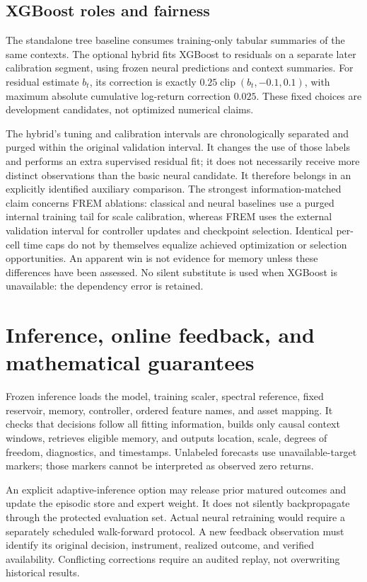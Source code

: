 \documentclass[11pt,a4paper]{article}
\newcommand{\clip}{\operatorname{clip}}
\begin{document}
\subsection{XGBoost roles and fairness}

The standalone tree baseline consumes training-only tabular summaries of the same contexts. The optional hybrid fits XGBoost to residuals on a separate later calibration segment, using frozen neural predictions and context summaries. For residual estimate $b_t$, its correction is exactly $0.25\clip(b_t,-0.1,0.1)$, with maximum absolute cumulative log-return correction $0.025$. These fixed choices are development candidates, not optimized numerical claims.

The hybrid's tuning and calibration intervals are chronologically separated and purged within the original validation interval. It changes the use of those labels and performs an extra supervised residual fit; it does not necessarily receive more distinct observations than the basic neural candidate. It therefore belongs in an explicitly identified auxiliary comparison. The strongest information-matched claim concerns FREM ablations: classical and neural baselines use a purged internal training tail for scale calibration, whereas FREM uses the external validation interval for controller updates and checkpoint selection. Identical per-cell time caps do not by themselves equalize achieved optimization or selection opportunities. An apparent win is not evidence for memory unless these differences have been assessed. No silent substitute is used when XGBoost is unavailable: the dependency error is retained.

\section{Inference, online feedback, and mathematical guarantees}

Frozen inference loads the model, training scaler, spectral reference, fixed reservoir, memory, controller, ordered feature names, and asset mapping. It checks that decisions follow all fitting information, builds only causal context windows, retrieves eligible memory, and outputs location, scale, degrees of freedom, diagnostics, and timestamps. Unlabeled forecasts use unavailable-target markers; those markers cannot be interpreted as observed zero returns.

An explicit adaptive-inference option may release prior matured outcomes and update the episodic store and expert weight. It does not silently backpropagate through the protected evaluation set. Actual neural retraining would require a separately scheduled walk-forward protocol. A new feedback observation must identify its original decision, instrument, realized outcome, and verified availability. Conflicting corrections require an audited replay, not overwriting historical results.
\end{document}
